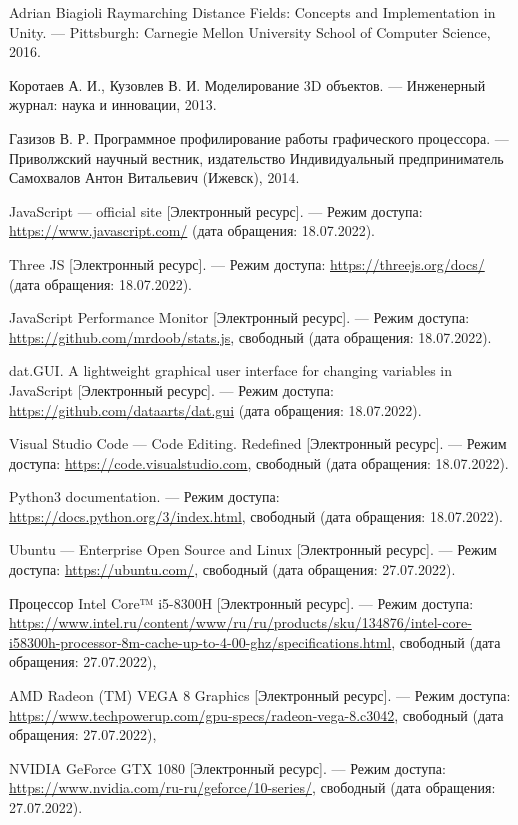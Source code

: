 \begin{thebibliography}{}
	Adrian Biagioli Raymarching Distance Fields: Concepts and Implementation in Unity. --- Pittsburgh: Carnegie Mellon University School of Computer Science, 2016.

	Коротаев А. И., Кузовлев В. И. Моделирование 3D объектов. --- Инженерный журнал: наука и инновации, 2013.
	
	Газизов В. Р. Программное профилирование работы графического процессора. --- Приволжский научный вестник, издательство Индивидуальный предприниматель Самохвалов Антон Витальевич (Ижевск), 2014.
	
	JavaScript --- official site [Электронный ресурс]. --- Режим доступа: \url{https://www.javascript.com/} (дата обращения: 18.07.2022).
	
	Three JS [Электронный ресурс]. --- Режим доступа: \url{https://threejs.org/docs/} (дата обращения: 18.07.2022).
	
	JavaScript Performance Monitor [Электронный ресурс]. --- Режим доступа: \url{https://github.com/mrdoob/stats.js}, свободный (дата обращения: 18.07.2022).
	
	dat.GUI. A lightweight graphical user interface for changing variables in JavaScript [Электронный ресурс]. --- Режим доступа: \url{https://github.com/dataarts/dat.gui} (дата обращения: 18.07.2022).
	
	Visual Studio Code --- Code Editing. Redefined [Электронный ресурс]. --- Режим доступа: \url{https://code.visualstudio.com}, свободный (дата обращения: 18.07.2022).
	
	Python3 documentation. --- Режим доступа: \url{https://docs.python.org/3/index.html}, свободный (дата обращения: 18.07.2022).
	
	Ubuntu --- Enterprise Open Source and Linux [Электронный
	ресурс]. --- Режим доступа: \url{https://ubuntu.com/}, свободный (дата обращения: 27.07.2022).
	
	Процессор Intel Core™ i5-8300H [Электронный ресурс]. --- Режим доступа: \url{https://www.intel.ru/content/www/ru/ru/products/sku/134876/intel-core-i58300h-processor-8m-cache-up-to-4-00-ghz/specifications.html}, свободный (дата обращения: 27.07.2022),
	
	AMD Radeon (TM) VEGA 8 Graphics [Электронный ресурс]. --- Режим доступа: \url{https://www.techpowerup.com/gpu-specs/radeon-vega-8.c3042}, свободный (дата обращения: 27.07.2022),
	
	NVIDIA GeForce GTX 1080 [Электронный ресурс]. --- Режим доступа: \url{https://www.nvidia.com/ru-ru/geforce/10-series/}, свободный (дата обращения: 27.07.2022).
\end{thebibliography}
\endgroup

\pagebreak